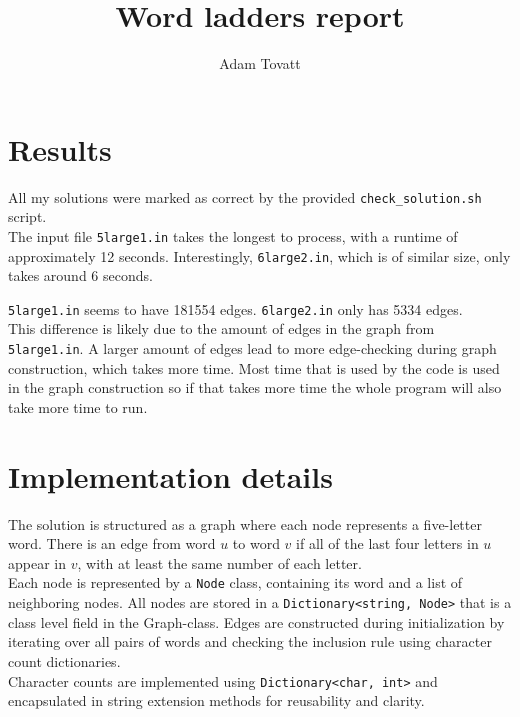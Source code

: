 \documentclass{article}
\title{Word ladders report}
\author{Adam Tovatt}
\begin{document}
  \maketitle

  \section{Results}

  All my solutions were marked as correct by the provided \texttt{check\_solution.sh} script.\\

  The input file \texttt{5large1.in} takes the longest to process, with a runtime of approximately 12 seconds. Interestingly, \texttt{6large2.in}, which is of similar size, only takes around 6 seconds.
  
 \texttt{5large1.in} seems to have 181554 edges.
 \texttt{6large2.in} only has 5334 edges.\\
  
  This difference is likely due to the amount of edges in the graph from \texttt{5large1.in}. A larger amount of edges lead to more edge-checking during graph construction, which takes more time. Most time that is used by the code is used in the graph construction so if that takes more time the whole program will also take more time to run.\\

  \section{Implementation details}

  The solution is structured as a graph where each node represents a five-letter word. There is an edge from word $u$ to word $v$ if all of the last four letters in $u$ appear in $v$, with at least the same number of each letter.\\

  Each node is represented by a \texttt{Node} class, containing its word and a list of neighboring nodes. All nodes are stored in a \texttt{Dictionary<string, Node>} that is a class level field in the Graph-class. Edges are constructed during initialization by iterating over all pairs of words and checking the inclusion rule using character count dictionaries.\\

  Character counts are implemented using \texttt{Dictionary<char, int>} and encapsulated in string extension methods for reusability and clarity.\\
\end{document}
